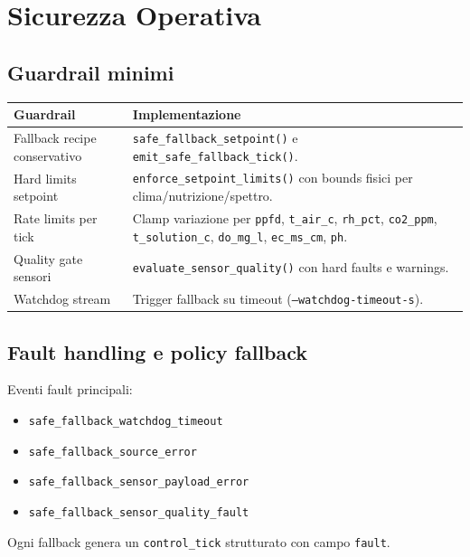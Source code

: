 ﻿\documentclass[11pt,a4paper]{report}
\begin{document}
\newpage
\chapter{Sicurezza Operativa}

\section{Guardrail minimi}
\begin{longtable}{@{}p{4.6cm}p{8.6cm}@{}}
\toprule
Guardrail & Implementazione \\ \midrule
Fallback recipe conservativo & \texttt{safe\_fallback\_setpoint()} e \texttt{emit\_safe\_fallback\_tick()}. \\
Hard limits setpoint & \texttt{enforce\_setpoint\_limits()} con bounds fisici per clima/nutrizione/spettro. \\
Rate limits per tick & Clamp variazione per \texttt{ppfd}, \texttt{t\_air\_c}, \texttt{rh\_pct}, \texttt{co2\_ppm}, \texttt{t\_solution\_c}, \texttt{do\_mg\_l}, \texttt{ec\_ms\_cm}, \texttt{ph}. \\
Quality gate sensori & \texttt{evaluate\_sensor\_quality()} con hard faults e warnings. \\
Watchdog stream & Trigger fallback su timeout (\texttt{--watchdog-timeout-s}). \\
\bottomrule
\end{longtable}

\section{Fault handling e policy fallback}
Eventi fault principali:
\begin{itemize}
  \item \texttt{safe\_fallback\_watchdog\_timeout}
  \item \texttt{safe\_fallback\_source\_error}
  \item \texttt{safe\_fallback\_sensor\_payload\_error}
  \item \texttt{safe\_fallback\_sensor\_quality\_fault}
\end{itemize}
Ogni fallback genera un \texttt{control\_tick} strutturato con campo \texttt{fault}.
\end{document}
